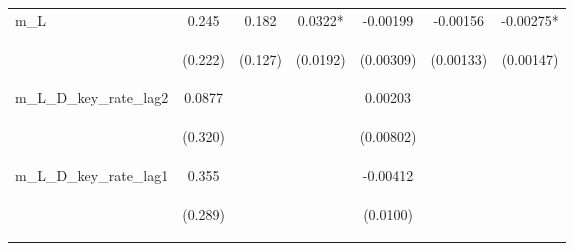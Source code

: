 \documentclass[]{article}
\begin{document}
\begin{center}
\begin{tabular}{lcccccc}
m\_L & 0.245 & 0.182 & 0.0322* & -0.00199 & -0.00156 & -0.00275* \\
\vspace{4pt} & \begin{footnotesize}(0.222)\end{footnotesize} & \begin{footnotesize}(0.127)\end{footnotesize} & \begin{footnotesize}(0.0192)\end{footnotesize} & \begin{footnotesize}(0.00309)\end{footnotesize} & \begin{footnotesize}(0.00133)\end{footnotesize} & \begin{footnotesize}(0.00147)\end{footnotesize} \\
m\_L\_D\_key\_rate\_lag2 & 0.0877 &  &  & 0.00203 &  &  \\
\vspace{4pt} & \begin{footnotesize}(0.320)\end{footnotesize} & \begin{footnotesize}\end{footnotesize} & \begin{footnotesize}\end{footnotesize} & \begin{footnotesize}(0.00802)\end{footnotesize} & \begin{footnotesize}\end{footnotesize} & \begin{footnotesize}\end{footnotesize} \\
m\_L\_D\_key\_rate\_lag1 & 0.355 &  &  & -0.00412 &  &  \\
\vspace{4pt} & \begin{footnotesize}(0.289)\end{footnotesize} & \begin{footnotesize}\end{footnotesize} & \begin{footnotesize}\end{footnotesize} & \begin{footnotesize}(0.0100)\end{footnotesize} & \begin{footnotesize}\end{footnotesize} & \begin{footnotesize}\end{footnotesize} \\

\end{tabular}
\end{center}
\end{document}
